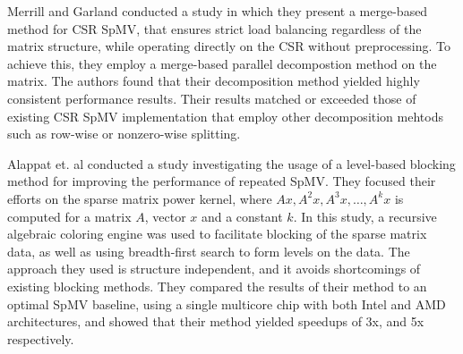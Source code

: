 


\medskip



Merrill and Garland \cite{merrilduane} conducted a study in which they present a merge-based method for CSR SpMV, that ensures strict load balancing regardless of the matrix structure, while operating directly on the CSR without preprocessing. To achieve this, they employ a merge-based parallel decompostion method on the matrix. The authors found that their decomposition method yielded highly consistent performance results. Their results matched or exceeded those of existing CSR SpMV implementation that employ other decomposition mehtods such as row-wise or nonzero-wise splitting.
\medskip

Alappat et. al \cite{9956740} conducted a study investigating the usage of a level-based blocking method for improving the performance of repeated SpMV. They focused their efforts on the sparse matrix power kernel, where \(Ax, A^2x, A^3x, \hdots ,A^{k}x\) is computed for a matrix \(A\), vector \(x\) and a constant \(k\). In this study, a recursive algebraic coloring engine was used to facilitate blocking of the sparse matrix data, as well as using breadth-first search to form levels on the data. The approach they used is structure independent, and it avoids shortcomings of existing blocking methods. They compared the results of their method to an optimal SpMV baseline, using a single multicore chip with both Intel and AMD architectures, and showed that their method yielded speedups of 3x, and 5x respectively.
\medskip

